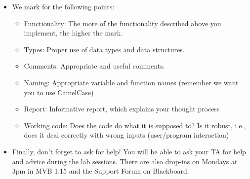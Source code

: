 \documentclass[11pt]{report}
\begin{document}
\begin{itemize}
	\vspace{0.5em}
	{\tt def SomeFunction(SomeArgument):}\\
	{\tt \hspace*{2em}"""}\\
	{\tt \hspace*{2em}This function does ...}\\
	{\tt \hspace*{2em}....and it does this....}\\
	{\tt \hspace*{2em}"""}
	\vspace{0.5em}
	
	\item We mark for the following points:
	\begin{itemize}
	    \item Functionality: The more of the functionality described above you implement, the higher the mark.
	    \item Types: Proper use of data types and data structures. 
	    \item Comments: Appropriate and useful comments. 
	    \item Naming: Appropriate variable and function names (remember we want you to use CamelCase)
	    \item Report: Informative report, which explains your thought process 
	    \item Working code: Does the code do what it is supposed to? Is it robust, i.e., does it deal correctly with wrong inputs (user/program interaction)
	\end{itemize}
	
	\item Finally, don't forget to ask for help! You will be able to ask your TA for help and advice during the lab sessions. There are also drop-ins on Mondays at 3pm in MVB 1.15 and the Support Forum on Blackboard.
\end{itemize}
\end{document}
